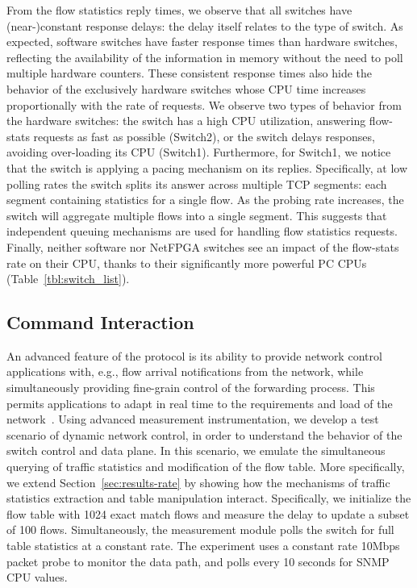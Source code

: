 From the flow statistics reply times, we observe that all switches have
(near-)constant response delays: the delay itself relates to the type of switch.
As expected, software switches have faster response times than hardware
switches, reflecting the availability of the information in memory without the
need to poll multiple hardware counters. These consistent response times also
hide the behavior of the exclusively hardware switches whose CPU time increases
proportionally with the rate of requests.  We observe two types of behavior from
the hardware switches: the switch has a high CPU utilization, answering
flow-stats requests as fast as possible (Switch2), or the switch delays
responses, avoiding over-loading its CPU (Switch1). Furthermore, for Switch1, we
notice that the switch is applying a pacing mechanism on its replies.
Specifically, at low polling rates the switch splits its answer across multiple
TCP segments: each segment containing statistics for a single flow.  As the
probing rate increases, the switch will aggregate multiple flows into a single
segment. This suggests that independent queuing mechanisms are used for handling
flow statistics requests. Finally, neither software nor NetFPGA switches see an
impact of the flow-stats rate on their CPU, thanks to their significantly more
powerful PC CPUs (Table~\ref{tbl:switch_list}).

\subsection{\of Command Interaction}\label{sec:results-interactions}


An advanced feature of the \of protocol is its ability to provide network
control applications with, e.g., flow arrival notifications from the network,
while simultaneously providing fine-grain control of the forwarding process.
This permits applications to adapt in real time to the requirements and load of
the network~. Using \oflops advanced measurement
instrumentation, we develop a test scenario of dynamic network control, in order
to understand the behavior of the switch control and data plane.  In this
scenario, we emulate the simultaneous querying of traffic statistics and
modification of the flow table.  More specifically, we extend
Section~\ref{sec:results-rate} by showing how the mechanisms of traffic
statistics extraction and table manipulation interact. Specifically, we
initialize the flow table with 1024 exact match flows and measure the delay to
update a subset of 100 flows.  Simultaneously, the measurement module polls the
switch for full table statistics at a constant rate. The experiment uses a
constant rate 10Mbps packet probe to monitor the data path, and polls every 10
seconds for SNMP CPU values.

